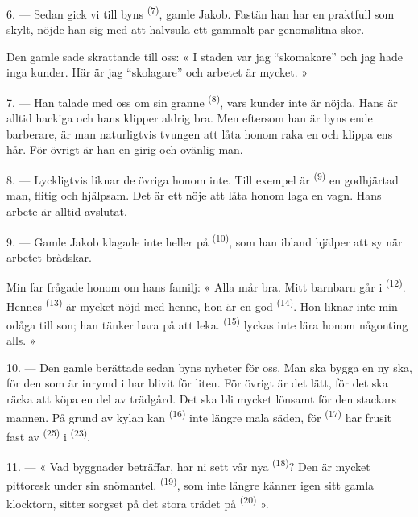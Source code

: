 6. --- Sedan gick vi till byns  \textsuperscript{(7)}, gamle Jakob. Fastän
han har en praktfull  som skylt, nöjde han sig med att halvsula ett gammalt par
genomslitna skor.

Den gamle sade skrattande till oss: « I staden var jag “skomakare” och jag hade inga kunder.
Här är jag “skolagare” och arbetet är mycket. »

7. --- Han talade med oss om sin granne  \textsuperscript{(8)}, vars kunder
inte är nöjda. Hans  är alltid hackiga och hans  klipper
aldrig bra. Men eftersom han är byns ende barberare, är man naturligtvis tvungen att låta
honom raka en och klippa ens hår. För övrigt är han en girig och ovänlig man.

8. --- Lyckligtvis liknar de övriga  honom inte. Till exempel är
 \textsuperscript{(9)} en godhjärtad man, flitig och hjälpsam. Det är ett
nöje att låta honom laga en vagn. Hans arbete är alltid avslutat.

9. --- Gamle Jakob klagade inte heller på  \textsuperscript{(10)}, som
han ibland hjälper att sy  när arbetet brådskar.

Min far frågade honom om hans familj: « Alla mår bra. Mitt barnbarn går i
 \textsuperscript{(12)}. Hennes 
\textsuperscript{(13)} är mycket nöjd med henne, hon är en god 
\textsuperscript{(14)}. Hon liknar inte min odåga till son; han tänker bara på att leka.
 \textsuperscript{(15)} lyckas inte lära honom någonting alls. »

\VUsaut{3.0mm}
\VUsaut{3.0mm}

10. --- Den gamle berättade sedan byns nyheter för oss. Man ska bygga en ny ska, för den som
är inrymd i  har blivit för liten. För övrigt är det lätt, för det ska
räcka att köpa en del av  trädgård. Det ska bli mycket lönsamt för den
stackars mannen. På grund av kylan kan  \textsuperscript{(16)}
 inte längre mala säden, för  \textsuperscript{(17)} har
frusit fast av
 \textsuperscript{(25)} i  \textsuperscript{(23)}.

11. --- « Vad byggnader beträffar, har ni sett vår nya  \textsuperscript{(18)}?
Den är mycket pittoresk under sin snömantel.
 \textsuperscript{(19)}, som inte längre känner igen sitt gamla
klocktorn, sitter sorgset på det stora trädet på  \textsuperscript{(20)}
».

